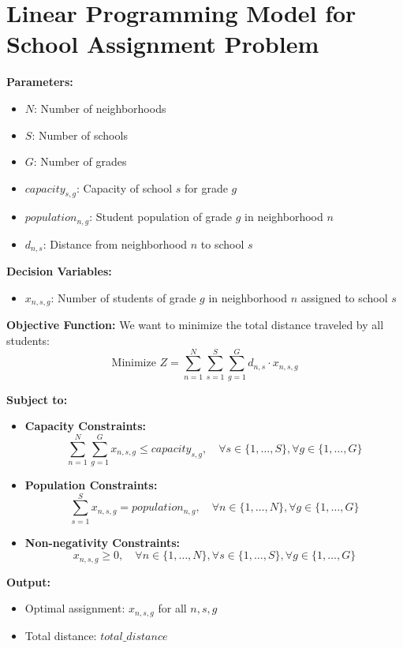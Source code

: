 \documentclass{article}
\begin{document}
\section*{Linear Programming Model for School Assignment Problem}

\textbf{Parameters:}
\begin{itemize}
    \item \( N \): Number of neighborhoods
    \item \( S \): Number of schools
    \item \( G \): Number of grades
    \item \( capacity_{s,g} \): Capacity of school \( s \) for grade \( g \)
    \item \( population_{n,g} \): Student population of grade \( g \) in neighborhood \( n \)
    \item \( d_{n,s} \): Distance from neighborhood \( n \) to school \( s \)
\end{itemize}

\textbf{Decision Variables:}
\begin{itemize}
    \item \( x_{n,s,g} \): Number of students of grade \( g \) in neighborhood \( n \) assigned to school \( s \)
\end{itemize}

\textbf{Objective Function:}
We want to minimize the total distance traveled by all students:
\[
\text{Minimize } Z = \sum_{n=1}^{N} \sum_{s=1}^{S} \sum_{g=1}^{G} d_{n,s} \cdot x_{n,s,g}
\]

\textbf{Subject to:}

\begin{itemize}
    \item \textbf{Capacity Constraints:}
    \[
    \sum_{n=1}^{N} \sum_{g=1}^{G} x_{n,s,g} \leq capacity_{s,g}, \quad \forall s \in \{1, \ldots, S\}, \forall g \in \{1, \ldots, G\}
    \]
    
    \item \textbf{Population Constraints:}
    \[
    \sum_{s=1}^{S} x_{n,s,g} = population_{n,g}, \quad \forall n \in \{1, \ldots, N\}, \forall g \in \{1, \ldots, G\}
    \]

    \item \textbf{Non-negativity Constraints:}
    \[
    x_{n,s,g} \geq 0, \quad \forall n \in \{1, \ldots, N\}, \forall s \in \{1, \ldots, S\}, \forall g \in \{1, \ldots, G\}
    \]
\end{itemize}

\textbf{Output:}
\begin{itemize}
    \item Optimal assignment: \( x_{n,s,g} \) for all \( n, s, g \)
    \item Total distance: \( total\_distance \)
\end{itemize}
\end{document}
